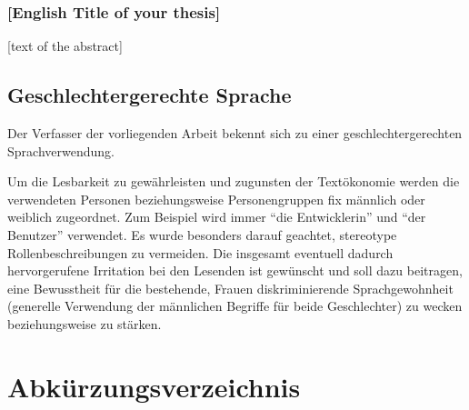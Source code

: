 \documentclass[a4paper,12pt,twoside]{scrreprt}
\begin{document}
\subsection*{[English Title of your thesis]}

[text of the abstract]

\newpage
\section*{Geschlechtergerechte Sprache}
\label{sec:gendern}

Der Verfasser der vorliegenden Arbeit bekennt sich zu einer geschlechtergerechten Sprachverwendung.

Um die Lesbarkeit zu gewährleisten und zugunsten der Textökonomie werden die verwendeten Personen beziehungsweise Personengruppen fix männlich oder weiblich zugeordnet. Zum Beispiel wird immer \enquote{die Entwicklerin} und \enquote{der Benutzer} verwendet. Es wurde besonders darauf geachtet, stereotype Rollenbeschreibungen zu vermeiden. Die insgesamt eventuell dadurch hervorgerufene Irritation bei den Lesenden ist gewünscht und soll dazu beitragen, eine Bewusstheit für die bestehende, Frauen diskriminierende Sprachgewohnheit (generelle Verwendung der männlichen Begriffe für beide Geschlechter) zu wecken beziehungsweise zu stärken.

\cleardoublepage %
\tableofcontents

\clearpage
{}
{}
\listoffigures

\clearpage
{}
{}
\chapter*{Abkürzungsverzeichnis}
\begin{acronym}
\end{acronym}
\end{document}
